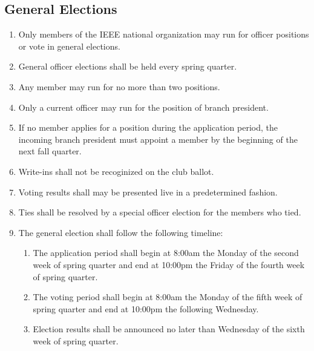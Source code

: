 \documentclass{article}
\begin{document}
\subsection{General Elections}
\label{sec:general_elections}
\begin{enumerate}
\item Only members of the IEEE national organization may run for officer positions or vote in general elections.
\item General officer elections shall be held every spring quarter. 
\item Any member may run for no more than two positions.
\item Only a current officer may run for the position of branch president.
\item If no member applies for a position during the application period, the incoming branch president must appoint a member by the beginning of the next fall quarter.
\item Write-ins shall not be recoginized on the club ballot.
\item Voting results shall may be presented live in a predetermined fashion.
\item Ties shall be resolved by a special officer election for the members who tied.
\item The general election shall follow the following timeline:
  \begin{enumerate}
  \item The application period shall begin at 8:00am the Monday of the second week of spring quarter and end at 10:00pm the Friday of the fourth week of spring quarter.
  \item The voting period shall begin at 8:00am the Monday of the fifth week of spring quarter and end at 10:00pm the following Wednesday.
  \item Election results shall be announced no later than Wednesday of the sixth week of spring quarter.
  \end{enumerate}
\end{enumerate}
\end{document}
